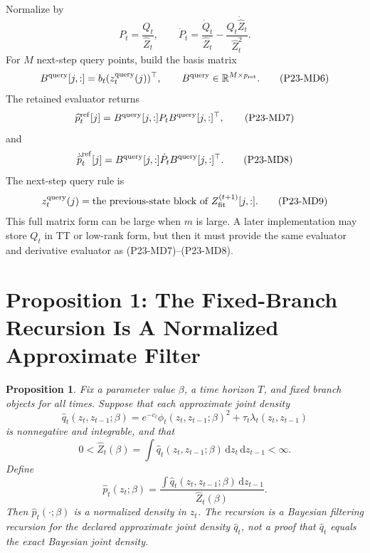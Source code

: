 \documentclass[11pt]{article}
\newtheorem{proposition}{Proposition}
\newcommand{\R}{\mathbb R}
\newcommand{\dd}{\,\mathrm d}
\begin{document}
Normalize by
\[
    P_t=\frac{Q_t}{\widehat Z_t},
    \qquad
    \dot P_t=
    \frac{\dot Q_t}{\widehat Z_t}
    -
    \frac{Q_t\dot{\widehat Z}_t}{\widehat Z_t^2}.
    \tag{P23-MD5}
\]
For \(M\) next-step query points, build the basis matrix
\[
    B^{\rm query}[j,:]=b_t(z_t^{\rm query}(j))^\top,
    \qquad
    B^{\rm query}\in\R^{M\times p_{\rm ret}}.
    \tag{P23-MD6}
\]
The retained evaluator returns
\[
    \widehat p_t^{\rm ref}[j]
    =
    B^{\rm query}[j,:]P_tB^{\rm query}[j,:]^\top,
    \tag{P23-MD7}
\]
and
\[
    \dot{\widehat p}_t^{\rm ref}[j]
    =
    B^{\rm query}[j,:]\dot P_tB^{\rm query}[j,:]^\top.
    \tag{P23-MD8}
\]
The next-step query rule is
\[
    z_t^{\rm query}(j)
    =
    \text{the previous-state block of }Z_{\rm fit}^{(t+1)}[j,:].
    \tag{P23-MD9}
\]
This full matrix form can be large when \(m\) is large.  A later
implementation may store \(Q_t\) in TT or low-rank form, but then it must
provide the same evaluator and derivative evaluator as (P23-MD7)--(P23-MD8).

\section{Proposition 1: The Fixed-Branch Recursion Is A Normalized Approximate Filter}

\begin{proposition}
Fix a parameter value \(\beta\), a time horizon \(T\), and fixed branch objects
for all times.  Suppose that each approximate joint density
\[
    \widehat q_t(z_t,z_{t-1};\beta)
    =
    e^{-c_t}\phi_t(z_t,z_{t-1};\beta)^2
    +
    \tau_t\lambda_t(z_t,z_{t-1})
    \tag{P19-77}
\]
is nonnegative and integrable, and that
\[
    0<\widehat Z_t(\beta)
    =
    \int \widehat q_t(z_t,z_{t-1};\beta)\dd z_t\dd z_{t-1}
    <\infty.
    \tag{P19-78}
\]
Define
\[
    \widehat p_t(z_t;\beta)
    =
    \frac{\int \widehat q_t(z_t,z_{t-1};\beta)\dd z_{t-1}}
    {\widehat Z_t(\beta)}.
    \tag{P19-79}
\]
Then \(\widehat p_t(\cdot;\beta)\) is a normalized density in \(z_t\).  The
recursion is a Bayesian filtering recursion for the declared approximate joint
density \(\widehat q_t\), not a proof that \(\widehat q_t\) equals the exact
Bayesian joint density.
\end{proposition}
\end{document}
